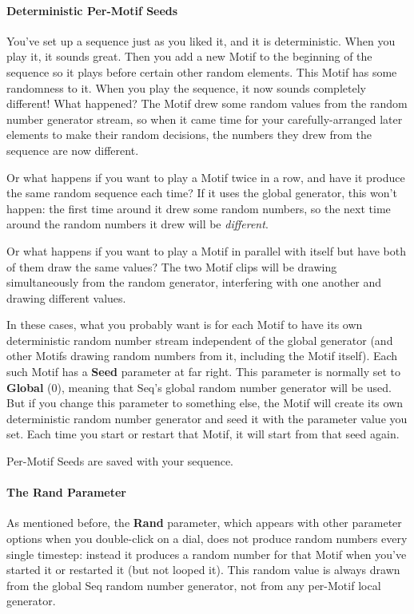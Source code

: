 \documentclass[twoside,10pt]{article}
\begin{document}
\paragraph{Deterministic Per-Motif Seeds}
You've set up a sequence just as you liked it, and it is deterministic.  When you play it, it sounds great.  Then you add a new Motif to the beginning of the sequence so it plays before certain other random elements.  This Motif has some randomness to it.  When you play the sequence, it now sounds completely different!  What happened?  The Motif drew some random values from the random number generator stream, so when it came time for your carefully-arranged later elements to make their random decisions, the numbers they drew from the sequence are now different.

Or what happens if you want to play a Motif twice in a row, and have it produce the same random sequence each time?  If it uses the global generator, this won't happen: the first time around it drew some random numbers, so the next time around the random numbers it drew will be {\it different}. 

Or what happens if you want to play a Motif in parallel with itself but have both of them draw the same values?  The two Motif clips will be drawing simultaneously from the random generator, interfering with one another and drawing different values.

In these cases, what you probably want is for each Motif to have its own deterministic random number stream independent of the global generator (and other Motifs drawing random numbers from it, including the Motif itself).   Each such Motif has a {\bf Seed} parameter at far right.  This parameter is normally set to {\bf Global} (0), meaning that Seq's global random number generator will be used.  But if you change this parameter to something else, the Motif will create its own deterministic random number generator and seed it with the parameter value you set.  Each time you start or restart that Motif, it will start from that seed again.

Per-Motif Seeds are saved with your sequence.

\paragraph{The Rand Parameter}  As mentioned before, the {\bf Rand} parameter, which appears with other parameter options when you double-click on a dial, does not produce random numbers every single timestep: instead it produces a random number for that Motif when you've started it or restarted it (but not looped it).  This random value is always drawn from the global Seq random number generator, not from any per-Motif local generator.
\end{document}
